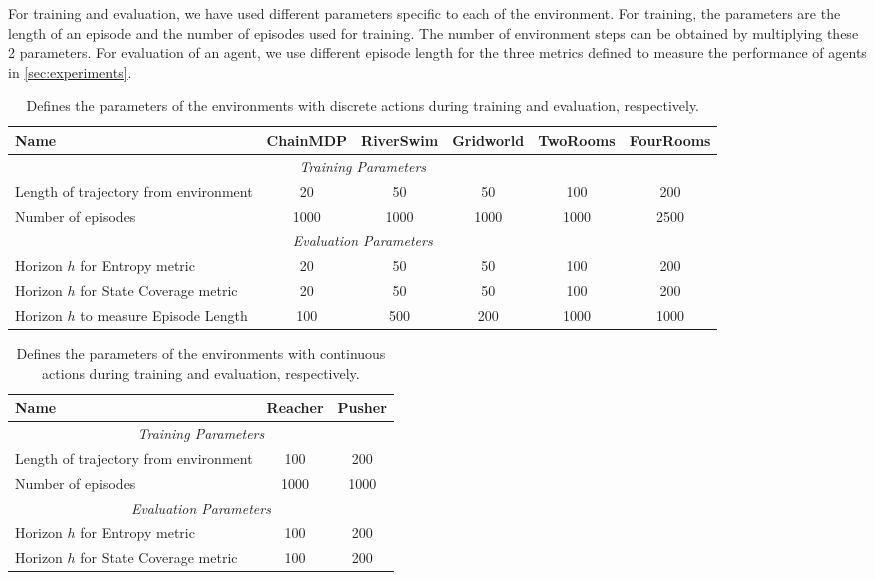 \documentclass{article}
\theoremstyle{plain}
\theoremstyle{definition}
\theoremstyle{remark}
\begin{document}
For training and evaluation, we have used different parameters specific to each of the environment. For training, the parameters are the length of an episode and the number of episodes used for training. The number of environment steps can be obtained by multiplying these 2 parameters. For evaluation of an agent, we use different episode length for the three metrics defined to measure the performance of agents in \autoref{sec:experiments}.

\begin{table}[hbt!]
\scriptsize
	\centering
		\begin{tabular}{l|ccccc}
			\toprule
			\textbf{Name} & \textbf{ChainMDP} & \textbf{RiverSwim} & \textbf{Gridworld} & \textbf{TwoRooms} & \textbf{FourRooms}\\
			\midrule
            \multicolumn{6}{c}{\textit{Training Parameters}}\\
            \midrule
             Length of trajectory from environment & 20 & 50 & 50 & 100 & 200 \\
             Number of episodes & 1000 & 1000 & 1000 & 1000 & 2500 \\
             \midrule
             \multicolumn{6}{c}{\textit{Evaluation Parameters}}\\
            \midrule
            Horizon $h$ for Entropy metric & 20 & 50 & 50 & 100 & 200 \\
            Horizon $h$ for State Coverage metric & 20 & 50 & 50 & 100 & 200\\
            Horizon $h$ to measure Episode Length & 100 & 500 & 200 & 1000 & 1000 \\
            \bottomrule
    	\end{tabular}
	\caption{Defines the parameters of the environments with discrete actions during training and evaluation, respectively.}
\end{table}

\begin{table}[hbt!]
\scriptsize
	\centering
		\begin{tabular}{l|cc}
			\toprule
			\textbf{Name} & \textbf{Reacher} & \textbf{Pusher} \\
			\midrule
            \multicolumn{3}{c}{\textit{Training Parameters}}\\
            \midrule
             Length of trajectory from environment & 100 & 200 \\
             Number of episodes & 1000 & 1000 \\
             \midrule
             \multicolumn{3}{c}{\textit{Evaluation Parameters}}\\
            \midrule
            Horizon $h$ for Entropy metric & 100 & 200 \\
            Horizon $h$ for State Coverage metric & 100 & 200 \\
            \bottomrule
    	\end{tabular}
	\caption{Defines the parameters of the environments with continuous actions during training and evaluation, respectively.}
\end{table}
\end{document}
